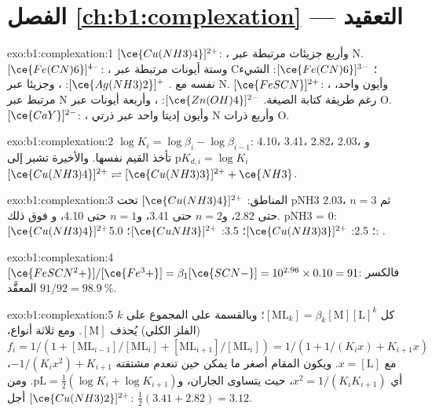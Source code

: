 \section*{الفصل \ref{ch:b1:complexation} --- التعقيد}

\begin{solution}{exo:b1:complexation:1}
$[\ce{Cu(NH3)4}]^{2+}$: ، وأربع جزيئات  مرتبطة عبر N.
$[\ce{Fe(CN)6}]^{4-}$: ، وستة أيونات  مرتبطة عبر C؛
$[\ce{Fe(CN)6}]^{3-}$: الشيء نفسه مع . $[\ce{Ag(NH3)2}]^{+}$:
، وجزيئا  عبر N. $[\ce{FeSCN}]^{2+}$: ، وأيون
 واحد، مرتبط عبر N رغم طريقة كتابة الصيغة.
$[\ce{Zn(OH)4}]^{2-}$: ، وأربعة أيونات  عبر O.
$[\ce{CaY}]^{2-}$: ، وأيون إديتا واحد عبر ذرتي N وأربع ذرات O.
\end{solution}

\begin{solution}{exo:b1:complexation:2}
$\log K_i = \log\beta_i - \log\beta_{i-1}$: 4.10، 3.41، 2.82، 2.03،
و$\mathrm{p}K_{d,i} = \log K_i$ تأخذ القيم نفسها. والأخيرة تشير إلى
$[\ce{Cu(NH3)4}]^{2+} \rightleftharpoons [\ce{Cu(NH3)3}]^{2+} + \ce{NH3}$.
\end{solution}

\begin{solution}{exo:b1:complexation:3}
المناطق: $[\ce{Cu(NH3)4}]^{2+}$ تحت pNH3 2.03، ثم $n = 3$ حتى 2.82،
و$n = 2$ حتى 3.41، و$n = 1$ حتى 4.10، و فوق ذلك. pNH3 = 0:
$[\ce{Cu(NH3)4}]^{2+}$؛ 2.5: $[\ce{Cu(NH3)3}]^{2+}$؛ 3.5:
$[\ce{CuNH3}]^{2+}$؛ 5.0: .
\end{solution}

\begin{solution}{exo:b1:complexation:4}
$[\ce{FeSCN^2+}]/[\ce{Fe^3+}] = \beta_1[\ce{SCN-}] = 10^{2.96} \times 0.10 =
91$: فالكسر المعقَّد $91/92 = \qty{98.9}{\percent}$.
\end{solution}

\begin{solution}{exo:b1:complexation:5}
كل $[\mathrm{ML}_k] = \beta_k[\mathrm{M}][\mathrm{L}]^k$؛ وبالقسمة على
المجموع على $k$ (الفلز الكلي) يُحذف $[\mathrm{M}]$. ومع ثلاثة
أنواع، $f_i = 1/(1 + [\mathrm{ML}_{i-1}]/[\mathrm{ML}_i] +
[\mathrm{ML}_{i+1}]/[\mathrm{ML}_i]) = 1/(1 + 1/(K_i x) + K_{i+1}x)$ مع
$x = [\mathrm{L}]$. ويكون المقام أصغر ما يمكن حين تنعدم مشتقته
$-1/(K_i x^2) + K_{i+1}$، أي $x^2 = 1/(K_iK_{i+1})$، حيث يتساوى
الجاران، و$\mathrm{pL} = \frac12(\log K_i + \log K_{i+1})$.
ومن أجل $[\ce{Cu(NH3)2}]^{2+}$: $\frac12(3.41 + 2.82) = 3.12$.
\end{solution}

